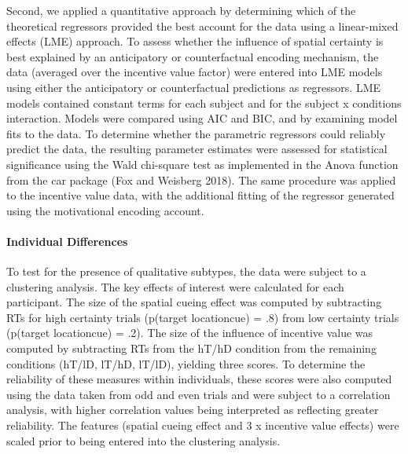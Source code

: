 \documentclass[11pt,halfline,a4paper,]{ouparticle}
\begin{document}
Second, we applied a quantitative approach by determining which of the theoretical regressors provided the best account for the data using a linear-mixed effects (LME) approach. To assess whether the influence of spatial certainty is best explained by an anticipatory or counterfactual encoding mechanism, the data (averaged over the incentive value factor) were entered into LME models using either the anticipatory or counterfactual predictions as regressors. LME models contained constant terms for each subject and for the subject x conditions interaction. Models were compared using AIC and BIC, and by examining model fits to the data. To determine whether the parametric regressors could reliably predict the data, the resulting parameter estimates were assessed for statistical significance using the Wald chi-square test as implemented in the Anova function from the car package (Fox and Weisberg 2018). The same procedure was applied to the incentive value data, with the additional fitting of the regressor generated using the motivational encoding account.

\hypertarget{individual-differences}{%
\paragraph{Individual Differences}\label{individual-differences}}

To test for the presence of qualitative subtypes, the data were subject to a clustering analysis. The key effects of interest were calculated for each participant. The size of the spatial cueing effect was computed by subtracting RTs for high certainty trials (p(target location\textbar cue) = .8) from low certainty trials (p(target location\textbar cue) = .2). The size of the influence of incentive value was computed by subtracting RTs from the hT/hD condition from the remaining conditions (hT/lD, lT/hD, lT/lD), yielding three scores. To determine the reliability of these measures within individuals, these scores were also computed using the data taken from odd and even trials and were subject to a correlation analysis, with higher correlation values being interpreted as reflecting greater reliability. The features (spatial cueing effect and 3 x incentive value effects) were scaled prior to being entered into the clustering analysis.
\end{document}
